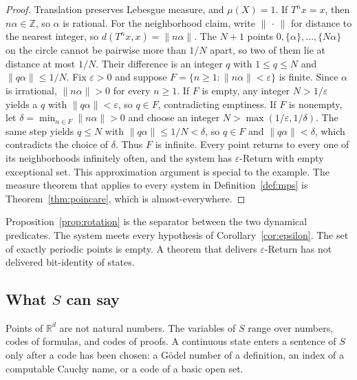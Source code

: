 \documentclass[11pt]{article}
\newcommand{\ZZ}{\mathbb{Z}}
\newcommand{\RR}{\mathbb{R}}
\theoremstyle{definition}
\theoremstyle{remark}
\begin{document}
\begin{proof}
Translation preserves Lebesgue measure, and \(\mu(X)=1\).
If \(T^{n}x=x\), then \(n\alpha\in\ZZ\), so \(\alpha\) is rational.
For the neighborhood claim, write \(\|\,\cdot\,\|\) for distance to the nearest integer, so \(d(T^{n}x,x)=\|n\alpha\|\).
The \(N+1\) points \(0,\{\alpha\},\ldots,\{N\alpha\}\) on the circle cannot be pairwise more than \(1/N\) apart, so two of them lie at distance at most \(1/N\).
Their difference is an integer \(q\) with \(1\leq q\leq N\) and \(\|q\alpha\|\leq 1/N\).
Fix \(\varepsilon>0\) and suppose \(F=\{n\geq 1:\|n\alpha\|<\varepsilon\}\) is finite.
Since \(\alpha\) is irrational, \(\|n\alpha\|>0\) for every \(n\geq 1\).
If \(F\) is empty, any integer \(N>1/\varepsilon\) yields a \(q\) with \(\|q\alpha\|<\varepsilon\), so \(q\in F\), contradicting emptiness.
If \(F\) is nonempty, let \(\delta=\min_{n\in F}\|n\alpha\|>0\) and choose an integer \(N>\max(1/\varepsilon,1/\delta)\).
The same step yields \(q\leq N\) with \(\|q\alpha\|\leq 1/N<\delta\), so \(q\in F\) and \(\|q\alpha\|<\delta\), which contradicts the choice of \(\delta\).
Thus \(F\) is infinite.
Every point returns to every one of its neighborhoods infinitely often, and the system has \(\varepsilon\)-Return with empty exceptional set.
This approximation argument is special to the example.
The measure theorem that applies to every system in Definition~\ref{def:mps} is Theorem~\ref{thm:poincare}, which is almost-everywhere.
\end{proof}

Proposition~\ref{prop:rotation} is the separator between the two dynamical predicates.
The system meets every hypothesis of Corollary~\ref{cor:epsilon}.
The set of exactly periodic points is empty.
A theorem that delivers \(\varepsilon\)-Return has not delivered bit-identity of states.

\subsection{What \texorpdfstring{\(S\)}{S} can say}

Points of \(\RR^{d}\) are not natural numbers.
The variables of \(S\) range over numbers, codes of formulas, and codes of proofs.
A continuous state enters a sentence of \(S\) only after a code has been chosen: a G\"odel number of a definition, an index of a computable Cauchy name, or a code of a basic open set.
\end{document}
